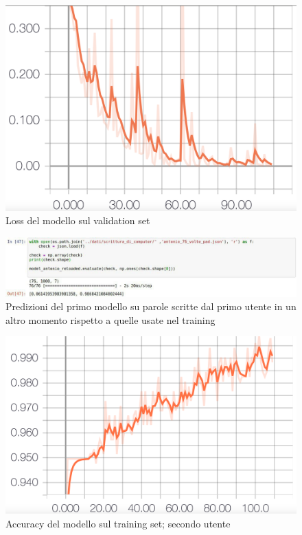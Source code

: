 \documentclass[8pt,notitlepage]{report}
\begin{document}
			\begin{figure}[H]
				\begin{center}
					\includegraphics[scale=.1865]{val_loss_Antonio}
					\caption{Loss del modello sul validation set}
				\end{center}
			\end{figure}
			
			\begin{figure}
				\begin{center}
					\includegraphics[scale=.5]{test_Antonio}
					\caption{Predizioni del primo modello su parole scritte dal primo utente in un altro momento rispetto a quelle usate nel training}
					\label{fig:prediction}
				\end{center}
			\end{figure}
			
			\newpage
			
			\begin{figure}[H]
				\begin{center}
					\includegraphics[scale=.16]{acc_Manuel}
					\caption{Accuracy del modello sul training set; secondo utente}
					\label{fig:acc_train_Manuel}
				\end{center}
			\end{figure}
			
\end{document}
